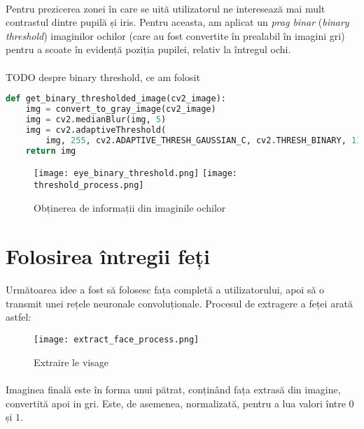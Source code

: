 \paragraph{}
Pentru prezicerea zonei în care se uită utilizatorul ne interesează mai mult contrastul dintre pupilă și iris.
Pentru aceasta, am aplicat un \emph{prag binar} (\emph{binary threshold}) imaginilor ochilor (care au fost convertite în prealabil în imagini gri) pentru a scoate în evidență poziția pupilei, relativ la întregul ochi.

\paragraph{}
TODO despre binary threshold, ce am folosit

\begin{lstlisting}[language=Python, caption=Application d'un seuil binaire]
def get_binary_thresholded_image(cv2_image):
    img = convert_to_gray_image(cv2_image)
    img = cv2.medianBlur(img, 5)
    img = cv2.adaptiveThreshold(
        img, 255, cv2.ADAPTIVE_THRESH_GAUSSIAN_C, cv2.THRESH_BINARY, 11, 2)
    return img
\end{lstlisting}

\begin{figure}[h]
    \centering
    \texttt{[image: eye\_binary\_threshold.png]}
    \texttt{[image: threshold\_process.png]}
    \caption{Obținerea de informații din imaginile ochilor}
\end{figure}

\section{Folosirea întregii feți}
\paragraph{}
Următoarea idee a fost să folosesc fața completă a utilizatorului, apoi să o transmit unei rețele neuronale convoluționale.
Procesul de extragere a feței arată astfel:
\begin{figure}[h]
    \centering
    \texttt{[image: extract\_face\_process.png]}
    \caption{Extraire le visage}
    \label{fig_extracted_faces}
\end{figure}

\paragraph{}
Imaginea finală este în forma unui pătrat, conținând fața extrasă din imagine, convertită apoi in gri.
Este, de asemenea, normalizată, pentru a lua valori între $0$ și $1$.

